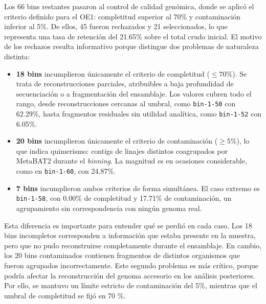 Los 66 bins restantes pasaron al control de calidad genómica, donde se aplicó el
criterio definido para el OE1: completitud superior al 70\% y contaminación
inferior al 5\%. De ellos, 45 fueron rechazados y 21 seleccionados, lo que
representa una tasa de retención del 21.65\% sobre el total crudo inicial. El
motivo de los rechazos resulta informativo porque distingue dos problemas de
naturaleza distinta:

\begin{itemize}
    \item \textbf{18 bins} incumplieron únicamente el criterio de completitud
    ($\le 70\%$). Se trata de reconstrucciones parciales, atribuibles a baja
    profundidad de secuenciación o a fragmentación del ensamblaje. Los valores
    cubren todo el rango, desde reconstrucciones cercanas al umbral, como
    \texttt{bin-1-50} con 62.29\%, hasta fragmentos residuales sin utilidad
    analítica, como \texttt{bin-1-52} con 6.05\%.
    \item \textbf{20 bins} incumplieron únicamente el criterio de contaminación
    ($\ge 5\text{\%}$), lo que indica quimerismo: contigs de linajes distintos
    coagrupados por MetaBAT2 durante el \textit{binning}. La magnitud es en
    ocasiones considerable, como en \texttt{bin-1-60}, con 24.87\%.
    \item \textbf{7 bins} incumplieron ambos criterios de forma simultánea. El
    caso extremo es \texttt{bin-1-58}, con 0.00\% de completitud y 17.71\% de
    contaminación, un agrupamiento sin correspondencia con ningún genoma real.
\end{itemize}


Esta diferencia es importante para entender qué se perdió en cada caso. Los 18 bins incompletos corresponden a información que estaba presente en la muestra, pero que no pudo reconstruirse completamente durante el ensamblaje. En cambio, los 20 bins contaminados contienen fragmentos de distintos organismos que fueron agrupados incorrectamente. Este segundo problema es más crítico, porque podría afectar la reconstrucción del genoma accesorio en los análisis posteriores. Por ello, se mantuvo un límite estricto de contaminación del 5\%, mientras que el umbral de completitud se fijó en 70 \%.

